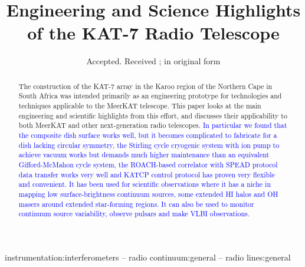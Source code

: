\documentclass[usenatbib,usegraphicx]{mn2e}
\begin{document}


\title[The KAT-7 Radio Telescope] {Engineering and Science Highlights of the KAT-7 Radio Telescope}

\date{Accepted. Received ; in original form }

\pagerange{\pageref{firstpage}--\pageref{lastpage}} 
\label{firstpage}


\maketitle

\begin{abstract}
The construction of the KAT-7 array in the Karoo region of the
Northern Cape in South Africa was intended primarily as an
engineering prototype for technologies and techniques applicable to
the MeerKAT telescope. This paper looks at  the main
engineering and scientific highlights from this effort, and
discusses their applicability to both MeerKAT and other
next-generation radio telescopes. 
\textcolor{blue}{In particular we found that the
composite dish surface works well, but it becomes complicated to
fabricate for a dish lacking circular symmetry, the Stirling cycle
cryogenic system with ion pump to achieve vacuum works but demands
much higher maintenance than an equivalent Gifford-McMahon cycle
system, the ROACH-based correlator with SPEAD protocol data transfer
works very well and KATCP control protocol has proven very flexible and 
convenient.
It has been used for scientific observations where it has a niche in mapping
low surface-brightness continuum sources, some extended HI halos and OH masers 
around extended star-forming regions. It can also be used to monitor
continuum source variability, observe pulsars and make VLBI observations.}
\end{abstract}

\begin{keywords}
instrumentation:interferometers --  radio continuum:general -- radio lines:general
\end{keywords}



\end{document}
